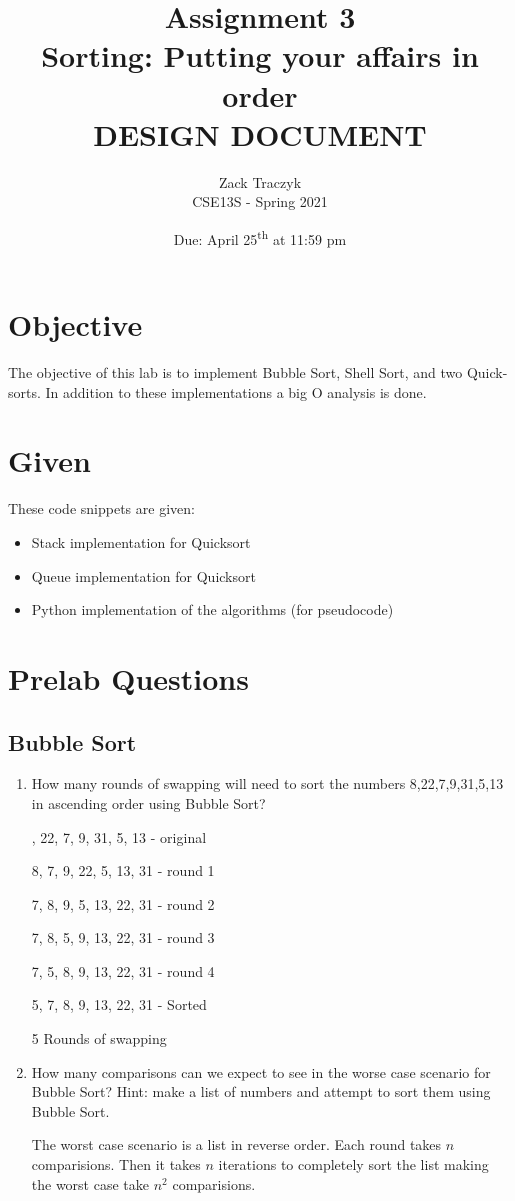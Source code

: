 \documentclass[12pt]{article}
\title{%
	\textbf{Assignment 3 \\ 
	Sorting: Putting your affairs in order \\
	\large DESIGN DOCUMENT}}
\author{Zack Traczyk \\ CSE13S - Spring 2021}
\date{Due: April 25\textsuperscript{th} at 11:59 pm}
\newenvironment{QandA}{\begin{enumerate}[label=\bfseries\alph*.]\bfseries}
                      {\end{enumerate}}
\newenvironment{answered}{\par\normalfont}{}
\begin{document}
\maketitle

\section{Objective}

The objective of this lab is to implement Bubble Sort, Shell Sort, and two Quick-sorts. In addition to these implementations a big O analysis is done.

\section{Given}

These code snippets are given:

\begin{itemize}
		\item Stack implementation for Quicksort
		\item Queue implementation for Quicksort
		\item Python implementation of the algorithms (for pseudocode)

\end{itemize}

\section{Prelab Questions}

\subsection{Bubble Sort}
\begin{QandA}

	\item How many rounds of swapping will need to sort the numbers 8,22,7,9,31,5,13 in ascending order using Bubble Sort?
		\begin{answered}
			8, 22, 7, 9, 31, 5, 13 - original

			8, 7, 9, 22, 5, 13, 31 - round 1

			7, 8, 9, 5, 13, 22, 31 - round 2

			7, 8, 5, 9, 13, 22, 31 - round 3

			7, 5, 8, 9, 13, 22, 31 - round 4

			5, 7, 8, 9, 13, 22, 31 - Sorted

			5 Rounds of swapping
		\end{answered}

	\item How many comparisons can we expect to see in the worse case scenario for Bubble Sort? Hint: make a list of numbers and attempt to sort them using Bubble Sort.

		\begin{answered}
			The worst case scenario is a list in reverse order. Each round takes $n$ comparisions. Then it takes $n$ iterations to completely sort the list making the worst case take $n^2$ comparisions.
		\end{answered}
\end{QandA}
\end{document}
